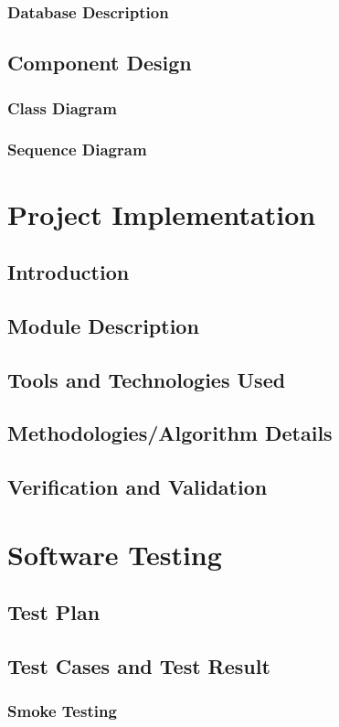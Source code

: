 \documentclass[a4paper, oneside, 12pt]{book}
\begin{document}
			\subsubsection{Database Description}
		\subsection{Component Design}
			\subsubsection{Class Diagram}
			\subsubsection{Sequence Diagram}
	\newpage
	\section{Project Implementation}
	\newpage
		\subsection{Introduction}
		\subsection{Module Description}
		\subsection{Tools and Technologies Used}
		\subsection{Methodologies/Algorithm Details}
		\subsection{Verification and Validation}
	\newpage	
	\section{Software Testing}
	\newpage
		\subsection{Test Plan}
		\subsection{Test Cases and Test Result}
			\subsubsection{Smoke Testing}
\end{document}
